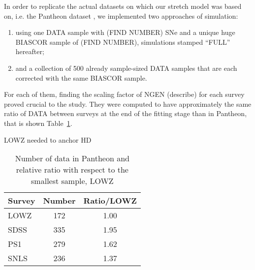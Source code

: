 \documentclass[../main/main.tex]{subfiles}
\begin{document}
In order to replicate the actual datasets on which our stretch model was based
on, i.e. the Pantheon dataset , we implemented two
approaches of simulation:

\begin{enumerate}
    \item using one DATA sample with (FIND NUMBER) SNe and a unique huge BIASCOR
        sample of (FIND NUMBER), simulations stamped ``FULL'' hereafter;
    \item and a collection of 500 already sample-sized DATA samples that are
        each corrected with the same BIASCOR sample.
\end{enumerate} 

For each of them, finding the scaling factor of NGEN (describe) for each survey
proved crucial to the study. They were computed to have approximately the same
ratio of DATA between surveys at the end of the fitting stage than in Pantheon,
that is shown Table~\ref{tab:ratio}.

LOWZ needed to anchor HD

\begin{table}
    \centering
    \caption{Number of data in Pantheon and relative ratio with respect to the
    smallest sample, LOWZ}
    \label{tab:ratio}
    \begin{tabular}{lcc}
        \toprule
        Survey & Number & Ratio/LOWZ \\
        \midrule
        LOWZ   & 172    & 1.00 \\
        SDSS   & 335    & 1.95 \\
        PS1    & 279    & 1.62 \\
        SNLS   & 236    & 1.37 \\
        \bottomrule
    \end{tabular}
\end{table}
\end{document}
